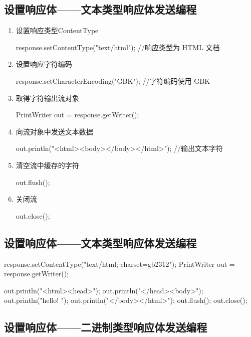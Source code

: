 \subsection{设置响应体——文本类型响应体发送编程}

\begin{enumerate}
\item 设置响应类型ContentType
  \begin{javaCode}
    response.setContentType("text/html"); //响应类型为 HTML 文档    
  \end{javaCode}
\item 设置响应字符编码
  \begin{javaCode}
    response.setCharacterEncoding("GBK"); //字符编码使用 GBK
  \end{javaCode}
\item 取得字符输出流对象
  \begin{javaCode}
    PrintWriter out = response.getWriter();
  \end{javaCode}
\item 向流对象中发送文本数据
  \begin{javaCode}
    out.println("<html><body></body></html>"); //输出文本字符
  \end{javaCode}
\item 清空流中缓存的字符
  \begin{javaCode}
    out.flush();
  \end{javaCode}
\item 关闭流
  \begin{javaCode}
    out.close();
  \end{javaCode}
\end{enumerate}

\subsection{设置响应体——文本类型响应体发送编程}


\begin{javaCode}
  response.setContentType("text/html; charset=gb2312");
  PrintWriter out = response.getWriter();

  out.println("<html><head>");
  out.println("</head><body>");
  out.println("hello! ");
  out.println("</body></html>");
  out.flush();
  out.close();
\end{javaCode} 

\subsection{设置响应体——二进制类型响应体发送编程}

